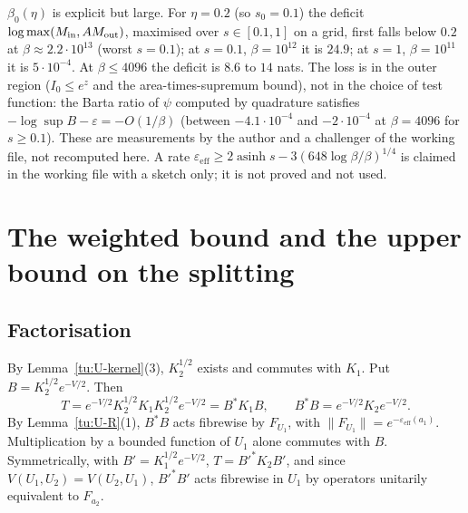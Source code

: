 \begin{remark}\label{tu:U-F-num}
$\beta_0(\eta)$ is explicit but large. For $\eta=0.2$ (so $s_0=0.1$) the deficit $\log\max(M_{\rm in},AM_{\rm out})$, maximised
over $s\in[0.1,1]$ on a grid, first falls below $0.2$ at $\beta\approx2.2\cdot10^{13}$ (worst $s=0.1$); at $s=0.1$,
$\beta=10^{12}$ it is $24.9$; at $s=1$, $\beta=10^{11}$ it is $5\cdot10^{-4}$. At $\beta\le4096$ the deficit is $8.6$ to $14$ nats.
The loss is in the outer region ($I_0\le e^z$ and the area-times-supremum bound), not in the choice of test
function: the Barta ratio of $\psi$ computed by quadrature satisfies $-\log\sup B-\varepsilon=-O(1/\beta)$ (between
$-4.1\cdot10^{-4}$ and $-2\cdot10^{-4}$ at $\beta=4096$ for $s\ge0.1$). These are measurements by the author and a challenger
of the working file, not recomputed here. A rate $\varepsilon_{\mathrm{eff}}\ge2\operatorname{asinh}s-3(648\log\beta/\beta)^{1/4}$
is claimed in the working file with a sketch only; it is not proved and not used.
\end{remark}

\section{The weighted bound and the upper bound on the splitting}\label{tu:U-sec-agmon}

\subsection{Factorisation}
By Lemma~\ref{tu:U-kernel}(3), $K_2^{1/2}$ exists and commutes with $K_1$. Put $B=K_2^{1/2}e^{-V/2}$. Then
\begin{equation}\label{tu:U-eq-fact}
T=e^{-V/2}K_2^{1/2}K_1K_2^{1/2}e^{-V/2}=B^*K_1B ,\qquad B^*B=e^{-V/2}K_2e^{-V/2}.
\end{equation}
By Lemma~\ref{tu:U-R}(1), $B^*B$ acts fibrewise by $F_{U_1}$, with $\|F_{U_1}\|=e^{-\varepsilon_{\mathrm{eff}}(a_1)}$.
Multiplication by a bounded function of $U_1$ alone commutes with $B$. Symmetrically, with
$B'=K_1^{1/2}e^{-V/2}$, $T=B'^*K_2B'$, and since $V(U_1,U_2)=V(U_2,U_1)$, $B'^*B'$ acts fibrewise in $U_1$ by
operators unitarily equivalent to $F_{a_2}$.

